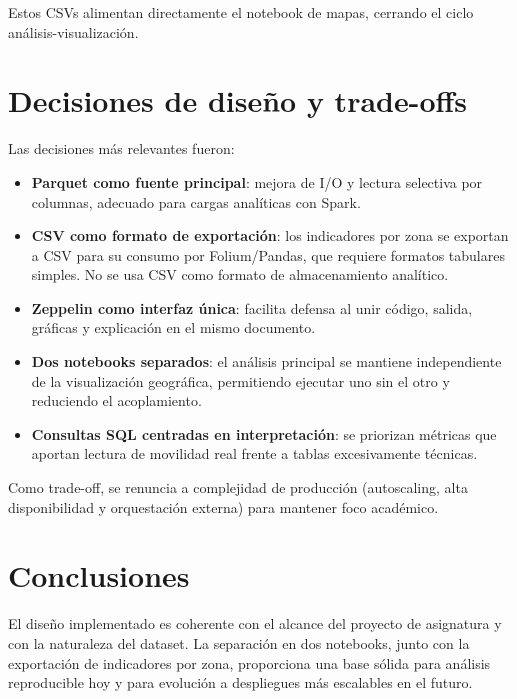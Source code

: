 Estos CSVs alimentan directamente el notebook de mapas, cerrando el ciclo
análisis-visualización.

\section{Decisiones de diseño y trade-offs}
Las decisiones más relevantes fueron:

\begin{itemize}
	\item \textbf{Parquet como fuente principal}: mejora de I/O y lectura selectiva
	por columnas, adecuado para cargas analíticas con Spark.
	\item \textbf{CSV como formato de exportación}: los indicadores por zona se
	exportan a CSV para su consumo por Folium/Pandas, que requiere formatos
	tabulares simples. No se usa CSV como formato de almacenamiento analítico.
	\item \textbf{Zeppelin como interfaz única}: facilita defensa al unir código,
	salida, gráficas y explicación en el mismo documento.
	\item \textbf{Dos notebooks separados}: el análisis principal se mantiene
	independiente de la visualización geográfica, permitiendo ejecutar uno sin
	el otro y reduciendo el acoplamiento.
	\item \textbf{Consultas SQL centradas en interpretación}: se priorizan métricas
	que aportan lectura de movilidad real frente a tablas excesivamente técnicas.
\end{itemize}

Como trade-off, se renuncia a complejidad de producción (autoscaling,
alta disponibilidad y orquestación externa) para mantener foco académico.

\section{Conclusiones}
El diseño implementado es coherente con el alcance del proyecto de asignatura y con
la naturaleza del dataset. La separación en dos notebooks, junto con la exportación
de indicadores por zona, proporciona una base sólida para análisis reproducible hoy y
para evolución a despliegues más escalables en el futuro.